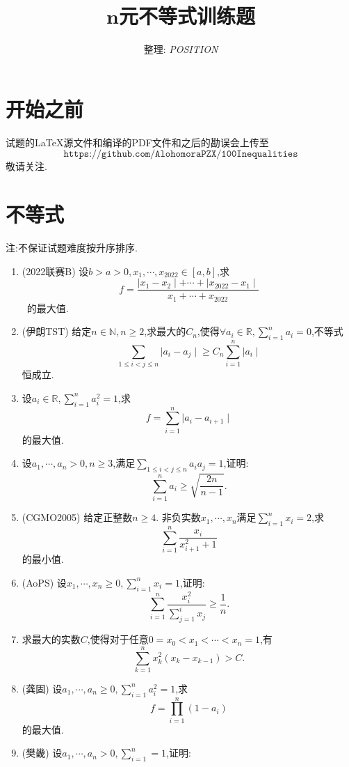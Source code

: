 \documentclass{article}
\title {\zihao{2} \textbf{$\boldsymbol{n}$元不等式训练题}}
\author{整理: \emph{POSITION}}
\date{ }
\begin{document}
    \maketitle
\section{开始之前}
    试题的{\LaTeX}源文件和编译的PDF文件和之后的勘误会上传至
    $$\texttt{https://github.com/AlohomoraPZX/100Inequalities}$$敬请关注.

\section{不等式}
   {\fangsong *注:不保证试题难度按升序排序.}
    \begin{enumerate} %
        \item (2022联赛B) 设$b>a>0,x_1,\cdots,x_{2022} \in [a,b]$,求\ 
            $$f=\frac{\mid x_1-x_2 \mid + \cdots + \mid x_{2022} - x_1 \mid}{x_1+\cdots+x_{2022}}$$\
            的最大值.
        \item (伊朗TST) 给定$n\in\mathbb{N},n\ge2$,求最大的$C_n$,使得$\forall a_i\in\mathbb{R},\sum_{i=1}^n{a_i}=0$,不等式 
            $$\sum_{1\le i<j\le n}{\mid a_i - a_j \mid}\ge C_n\sum_{i=1}^n{\mid a_i \mid}$$恒成立.
        \item 设$a_i\in\mathbb{R},\sum_{i=1}^n{a_i^2}=1$,求$$f=\sum_{i=1}^n{\mid a_i - a_{i+1} \mid}$$的最大值.
        \item 设$a_1,\cdots,a_n>0,n\ge3$,满足$\sum_{1\le i<j \le n}{a_i a_j}=1$,证明:\ 
            $$\sum_{i=1}^{n}{a_i}\ge\sqrt{\frac{2n}{n-1}}.$$
        \item (CGMO2005) 给定正整数$n\ge4$. 非负实数$x_1,\cdots,x_n$满足$\sum_{i=1}^n{x_i}=2$,求\
            $$\sum_{i=1}^n{\frac{x_i}{x_{i+1}^2+1}}$$的最小值.
        \item (AoPS) 设$x_1,\cdots,x_n\ge0,\sum_{i=1}^n{x_i}=1$,证明:\ 
            $$\sum_{i=1}^{n}{\frac{x_i^2}{\sum_{j=1}^i{x_j}}}\ge\frac{1}{n}.$$
        \item 求最大的实数$C$,使得对于任意$0=x_0<x_1<\cdots<x_n=1$,有\ 
            $$\sum_{k=1}^n{x_k^2\left( x_k - x_{k-1}\right)} > C.$$
        \item (龚固) 设$a_1,\cdots,a_n\ge0,\sum_{i=1}^n{a_i^2}=1$,求\ 
            $$f=\prod_{i=1}^n{\left( 1-a_i \right)}$$的最大值.
        \item (樊畿) 设$a_1,\cdots,a_n>0,\sum_{i=1}^n=1$,证明:\ 

\end{enumerate}
\end{document}
